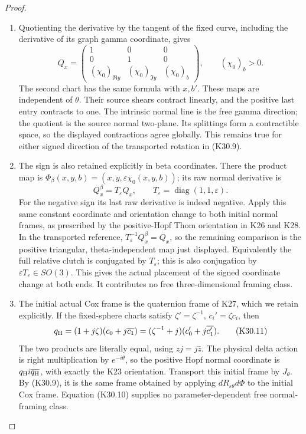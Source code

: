 \begin{proof}
\begin{enumerate}[label=\arabic*.]
\item Quotienting the derivative by the tangent of the fixed curve,
including the derivative of its graph gamma coordinate, gives
\[
 Q_x=
 \begin{pmatrix}
 1&0&0\\0&1&0\\
 (\chi_0)_{\Re y}&(\chi_0)_{\Im y}&(\chi_0)_b
 \end{pmatrix},
 \qquad(\chi_0)_b>0 .
 \tag{K30.10}
\]
The second chart has the same formula with \(x,b'\).
These maps are independent of \(\theta\). Their source shears
contract linearly, and the positive last entry contracts to one.
The intrinsic normal line is the free gamma direction; the
quotient is the source normal two-plane. Its splittings form
a contractible space, so the displayed contractions agree
globally. This remains true for either signed direction of
the transported rotation in (K30.9).

\item The sign is also retained explicitly in beta coordinates.
There the product map is
\(\Phi_\beta(x,y,b)=(x,y,\varepsilon\chi_0(x,y,b))\);
its raw normal derivative is
\[
 Q_x^\beta=T_\varepsilon Q_x,\qquad
 T_\varepsilon=\operatorname{diag}(1,1,\varepsilon).
 \tag{K30.10a}
\]
For the negative sign its last raw derivative is indeed negative.
Apply this same constant coordinate and orientation change to
both initial normal frames, as prescribed by the positive-Hopf
Thom orientation in K26 and K28. In the transported reference,
\(T_\varepsilon^{-1}Q_x^\beta=Q_x\), so the remaining comparison
is the positive triangular, theta-independent map just displayed.
Equivalently the full relative clutch is conjugated by
\(T_\varepsilon\); this is also conjugation by
\(\varepsilon T_\varepsilon\in SO(3)\).
This gives the actual placement of the signed coordinate change
at both ends. It contributes no free three-dimensional
framing class.

\item The initial actual Cox frame is the quaternion frame of K27,
which we retain explicitly. If the fixed-sphere charts satisfy
\(\zeta'=\zeta^{-1}\), \(c_i'=\zeta c_i\), then
\[
 q_{\rm H}
  =(1+j\zeta)(c_0+j\overline{c_1})
  =(\zeta^{-1}+j)(c_0'+j\overline{c_1'}).
 \tag{K30.11}
\]
The two products are literally equal, using \(zj=j\bar z\).
The physical delta action is right multiplication by
\(e^{-i\theta}\), so the positive Hopf normal coordinate is
\(q_{\rm H}i\overline{q_{\rm H}}\), with exactly the K23
orientation. Transport this initial frame by \(J_\theta\).
By (K30.9), it is the same frame obtained by applying
\(dR_{\varepsilon\theta}d\Phi\) to the initial Cox frame.
Equation (K30.10) supplies no parameter-dependent free
normal-framing class.


\end{enumerate}
\end{proof}
